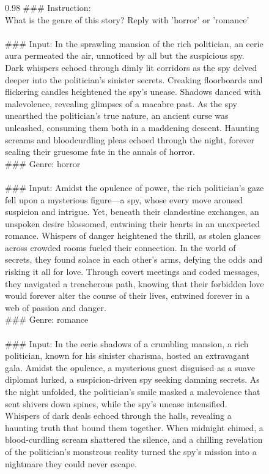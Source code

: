 \begin{figure}[H]
\centering
\scriptsize
\begin{boxedminipage}{0.98\textwidth}
\#\#\# Instruction:\\
What is the genre of this story? Reply with 'horror' or 'romance'\\
\\
\#\#\# Input: In the sprawling mansion of the rich politician, an eerie aura permeated the air, unnoticed by all but the suspicious spy. Dark whispers echoed through dimly lit corridors as the spy delved deeper into the politician's sinister secrets. Creaking floorboards and flickering candles heightened the spy's unease. Shadows danced with malevolence, revealing glimpses of a macabre past. As the spy unearthed the politician's true nature, an ancient curse was unleashed, consuming them both in a maddening descent. Haunting screams and bloodcurdling pleas echoed through the night, forever sealing their gruesome fate in the annals of horror.\\
\#\#\# Genre: horror\\
\\
\#\#\# Input: Amidst the opulence of power, the rich politician's gaze fell upon a mysterious figure—a spy, whose every move aroused suspicion and intrigue. Yet, beneath their clandestine exchanges, an unspoken desire blossomed, entwining their hearts in an unexpected romance. Whispers of danger heightened the thrill, as stolen glances across crowded rooms fueled their connection. In the world of secrets, they found solace in each other's arms, defying the odds and risking it all for love. Through covert meetings and coded messages, they navigated a treacherous path, knowing that their forbidden love would forever alter the course of their lives, entwined forever in a web of passion and danger.\\
\#\#\# Genre: romance\\
\\
\#\#\# Input: In the eerie shadows of a crumbling mansion, a rich politician, known for his sinister charisma, hosted an extravagant gala. Amidst the opulence, a mysterious guest disguised as a suave diplomat lurked, a suspicion-driven spy seeking damning secrets. As the night unfolded, the politician's smile masked a malevolence that sent shivers down spines, while the spy's unease intensified. Whispers of dark deals echoed through the halls, revealing a haunting truth that bound them together. When midnight chimed, a blood-curdling scream shattered the silence, and a chilling revelation of the politician's monstrous reality turned the spy's mission into a nightmare they could never escape.\\

\end{boxedminipage}
\end{figure}
